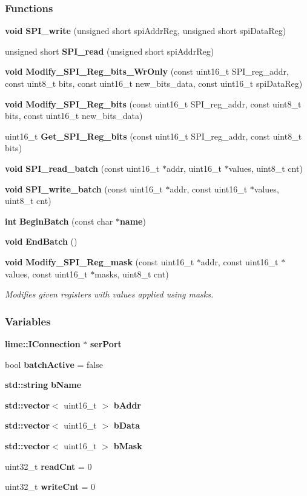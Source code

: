 \subsubsection*{Functions}
\begin{DoxyCompactItemize}
\item 
{\bf void} {\bf S\+P\+I\+\_\+write} (unsigned short spi\+Addr\+Reg, unsigned short spi\+Data\+Reg)
\item 
unsigned short {\bf S\+P\+I\+\_\+read} (unsigned short spi\+Addr\+Reg)
\item 
{\bf void} {\bf Modify\+\_\+\+S\+P\+I\+\_\+\+Reg\+\_\+bits\+\_\+\+Wr\+Only} (const uint16\+\_\+t S\+P\+I\+\_\+reg\+\_\+addr, const uint8\+\_\+t bits, const uint16\+\_\+t new\+\_\+bits\+\_\+data, const uint16\+\_\+t spi\+Data\+Reg)
\item 
{\bf void} {\bf Modify\+\_\+\+S\+P\+I\+\_\+\+Reg\+\_\+bits} (const uint16\+\_\+t S\+P\+I\+\_\+reg\+\_\+addr, const uint8\+\_\+t bits, const uint16\+\_\+t new\+\_\+bits\+\_\+data)
\item 
uint16\+\_\+t {\bf Get\+\_\+\+S\+P\+I\+\_\+\+Reg\+\_\+bits} (const uint16\+\_\+t S\+P\+I\+\_\+reg\+\_\+addr, const uint8\+\_\+t bits)
\item 
{\bf void} {\bf S\+P\+I\+\_\+read\+\_\+batch} (const uint16\+\_\+t $\ast$addr, uint16\+\_\+t $\ast$values, uint8\+\_\+t cnt)
\item 
{\bf void} {\bf S\+P\+I\+\_\+write\+\_\+batch} (const uint16\+\_\+t $\ast$addr, const uint16\+\_\+t $\ast$values, uint8\+\_\+t cnt)
\item 
{\bf int} {\bf Begin\+Batch} (const char $\ast${\bf name})
\item 
{\bf void} {\bf End\+Batch} ()
\item 
{\bf void} {\bf Modify\+\_\+\+S\+P\+I\+\_\+\+Reg\+\_\+mask} (const uint16\+\_\+t $\ast$addr, const uint16\+\_\+t $\ast$values, const uint16\+\_\+t $\ast$masks, uint8\+\_\+t cnt)
\begin{DoxyCompactList}\small\item\em Modifies given registers with values applied using masks. \end{DoxyCompactList}\end{DoxyCompactItemize}
\subsubsection*{Variables}
\begin{DoxyCompactItemize}
\item 
{\bf lime\+::\+I\+Connection} $\ast$ {\bf ser\+Port}
\item 
bool {\bf batch\+Active} = false
\item 
{\bf std\+::string} {\bf b\+Name}
\item 
{\bf std\+::vector}$<$ uint16\+\_\+t $>$ {\bf b\+Addr}
\item 
{\bf std\+::vector}$<$ uint16\+\_\+t $>$ {\bf b\+Data}
\item 
{\bf std\+::vector}$<$ uint16\+\_\+t $>$ {\bf b\+Mask}
\item 
uint32\+\_\+t {\bf read\+Cnt} = 0
\item 
uint32\+\_\+t {\bf write\+Cnt} = 0
\end{DoxyCompactItemize}


